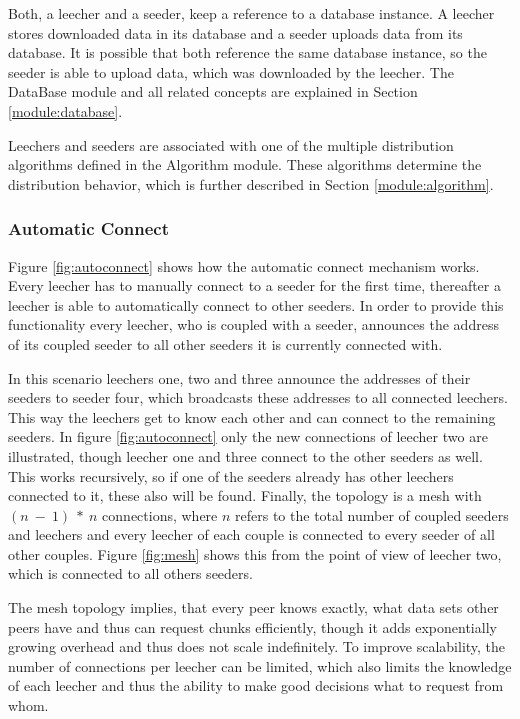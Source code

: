 Both, a leecher and a seeder, keep a reference to a database instance. A leecher stores downloaded data in its database and a seeder uploads data from its database. It is possible that both reference the same database instance, so the seeder is able to upload data, which was downloaded by the leecher. The DataBase module and all related concepts are explained in Section \ref{module:database}.

Leechers and seeders are associated with one of the multiple distribution algorithms defined in the Algorithm module. These algorithms determine the distribution behavior, which is further described in Section \ref{module:algorithm}.

\vfill

\subsubsection{Automatic Connect}
\label{module:core:net:autoconnect}

Figure \ref{fig:autoconnect} shows how the automatic connect mechanism works. Every leecher has to manually connect to a seeder for the first time, thereafter a leecher is able to automatically connect to other seeders. In order to provide this functionality every leecher, who is coupled with a seeder, announces the address of its coupled seeder to all other seeders it is currently connected with.

In this scenario leechers one, two and three announce the addresses of their seeders to seeder four, which broadcasts these addresses to all connected leechers. This way the leechers get to know each other and can connect to the remaining seeders. In figure \ref{fig:autoconnect} only the new connections of leecher two are illustrated, though leecher one and three connect to the other seeders as well. This works recursively, so if one of the seeders already has other leechers connected to it, these also will be found. Finally, the topology is a mesh with $(n\:-\:1)\:*\:n$ connections, where $n$ refers to the total number of coupled seeders and leechers and every leecher of each couple is connected to every seeder of all other couples. Figure \ref{fig:mesh} shows this from the point of view of leecher two, which is connected to all others seeders.

The mesh topology implies, that every peer knows exactly, what data sets other peers have and thus can request chunks efficiently, though it adds exponentially growing overhead and thus does not scale indefinitely. To improve scalability, the number of connections per leecher can be limited, which also limits the knowledge of each leecher and thus the ability to make good decisions what to request from whom.

